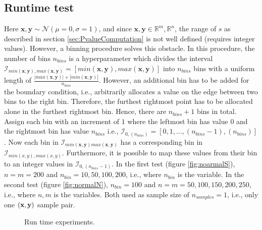 \documentclass[a4paper]{article}
\begin{document}
\subsection{Runtime test}
Here $\bm{x},\bm{y} \sim \mathcal{N}(\mu = 0,\sigma =1)$, and since $\bm{x},\bm{y} \in \mathbb{R}^{m}, \mathbb{R}^{n}$, the range of $s$ as described in section \ref{sec:PvalueComputation} is not well defined (requires integer values). However, a binning procedure solves this obstacle. In this procedure, the number of bins $n_{bins}$ is a hyperparameter which divides the interval $\mathcal{I}_{min(\bm{x},\bm{y}), max(\bm{x},\bm{y})}=[ min(\bm{x},\bm{y}), max(\bm{x},\bm{y}) ]$ into $n_{bins}$ bins with a uniform length of $\frac{|max(\bm{x},\bm{y})| + |min(\bm{x},\bm{y})|}{n_{bins}}$. However, an additional bin has to be added for the boundary condition, i.e., arbitrarily allocates a value on the edge between two bins to the right bin. Therefore, the furthest rightmost point has to be allocated alone in the furthest rightmost bin. Hence, there are $n_{bins}+1$ bins in total. Assign each bin with an increment of $1$ where the leftmost bin has value $0$ and the rightmost bin has value $n_{bins}$ i.e., $\mathcal{I}_{0, (n_{bins})}=[0,1,\ldots,(n_{bins}-1),(n_{bins})]$. Now each bin in $\mathcal{I}_{min(\bm{x},\bm{y}) max(\bm{x},\bm{y})}$ has a corresponding bin in $\mathcal{I}_{min(x,y), max(x,y)}$. Furthermore, it is possible to map these values from their bin to an integer values in $\mathcal{I}_{0, (n_{bins}-1)}$.
In the first test (figure \ref{fig:noarmalS}), $n=m=200$ and $n_{bin}=10,50,100,200$, i.e., where $n_{bin}$ is the variable. In the second test (figure \ref{fig:normalN}), $n_{bin}=100$ and $n=m=50, 100,150,200,250$, i.e., where $n,m$ is the variables. Both used as sample size of $n_{samples}=1$, i.e., only one $(\bf{x}, \bf{y})$ sample pair.
\FloatBarrier
\begin{figure}[!tbp]
  \centering
  \hfill
  \caption{Run time experiments.}
\end{figure}
\end{document}
